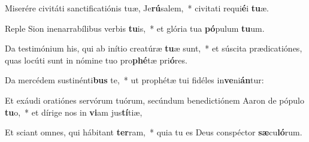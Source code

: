 \item Miserére civitáti sanctificatiónis tuæ, Je\textbf{rú}salem,~* civitati requi\textbf{é}i \textbf{tu}æ.
\item Reple Sion inenarrabílibus verbis \textbf{tu}is,~* et glória tua \textbf{pó}pulum \textbf{tu}um.
\item Da testimónium his, qui ab inítio creatúræ \textbf{tu}æ sunt,~* et súscita prædicatiónes, quas locúti sunt in nómine tuo pro\textbf{phé}tæ pri\textbf{ó}res.
\item Da mercédem sustinénti\textbf{bus} te,~* ut prophétæ tui fidéles in\textbf{ve}ni\textbf{án}tur:
\item Et exáudi oratiónes servórum tuórum, secúndum benedictiónem Aaron de pópulo \textbf{tu}o,~* et dírige nos in \textbf{vi}am jus\textbf{tí}tiæ,
\item Et sciant omnes, qui hábitant \textbf{ter}ram,~* quia tu es Deus conspéctor \textbf{sæ}cu\textbf{ló}rum.
